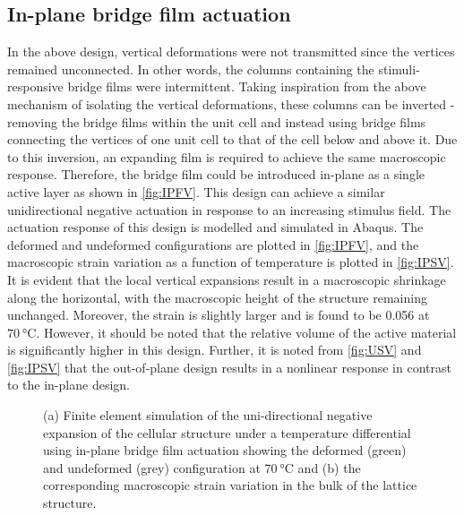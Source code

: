 \documentclass[final,times,5p]{elsarticle}
\numberwithin{equation}{section}
\begin{document}
\subsection{In-plane bridge film actuation}
In the above design, vertical deformations were not transmitted since the vertices remained unconnected. In other words, the columns containing the stimuli-responsive bridge films were intermittent. Taking inspiration from the above mechanism of isolating the vertical deformations, these columns can be inverted - removing the bridge films within the unit cell and instead using bridge films connecting the vertices of one unit cell to that of the cell below and above it. Due to this inversion, an expanding film is required to achieve the same macroscopic response. Therefore, the bridge film could be introduced in-plane as a single active layer as shown in \cref{fig:IPFV}. This design can achieve a similar unidirectional negative actuation in response to an increasing stimulus field. The actuation response of this design is modelled and simulated in Abaqus. The deformed and undeformed configurations are plotted in \cref{fig:IPFV}, and the macroscopic strain variation as a function of temperature is plotted in \cref{fig:IPSV}. It is evident that the local vertical expansions result in a macroscopic shrinkage along the horizontal, with the macroscopic height of the structure remaining unchanged. Moreover, the strain is slightly larger and is found to be 0.056 at $\SI{70}{\degreeCelsius}$. However, it should be noted that the relative volume of the active material is significantly higher in this design. Further, it is noted from \cref{fig:USV} and \cref{fig:IPSV} that the out-of-plane design results in a nonlinear response in contrast to the in-plane design.

 \begin{figure*}[htpb!]
\begin{center}  
    \hfill
{}
\end{center}
    \caption{(a) Finite element simulation of the uni-directional negative expansion of the cellular structure under a temperature differential using in-plane bridge film actuation showing the deformed (green) and undeformed (grey) configuration at $\SI{70}{\degreeCelsius}$ and (b) the corresponding macroscopic strain variation in the bulk of the lattice structure.}
    \label{fig:InPlane}
 \end{figure*}
\end{document}
